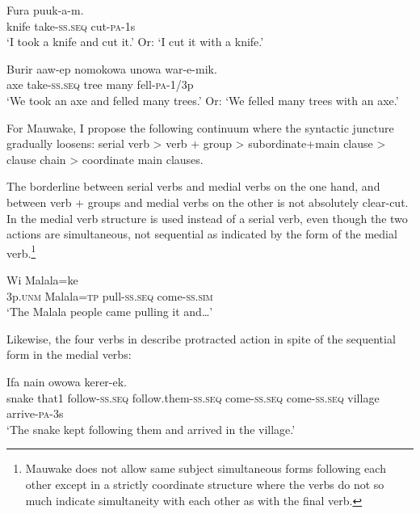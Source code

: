 \ea%
\label{ex:3:x387}
\gll Fura  puuk-a-m. \\
knife take-\textsc{ss}.\textsc{seq} cut-\textsc{pa}-1s \\
\glt`I took a knife and cut it.' Or: `I cut it with a knife.'
\z

\ea%
\label{ex:3:x388}
\gll Burir aaw-ep nomokowa unowa war-e-mik. \\
axe take-\textsc{ss}.\textsc{seq} tree many fell-\textsc{pa}-1/3p \\
\glt`We took an axe and felled many trees.' Or: `We felled many trees with an axe.'
\z

For Mauwake, I propose the following continuum where the syntactic juncture gradually loosens: serial verb {{\textgreater}} verb +  group {{\textgreater}} subordinate+main clause {{\textgreater}} clause chain {{\textgreater}} coordinate main clauses.

The borderline between serial verbs and medial verbs on the one hand, and between verb +  groups and medial verbs on the other is not absolutely clear-cut. In  the medial verb structure is used instead of a serial verb, even though the two actions are simultaneous, not sequential as indicated by the form of the medial verb.\footnote{Mauwake does not allow same subject simultaneous forms following each other except in a strictly coordinate structure where the verbs do not so much indicate simultaneity with each other as with the final verb.} 

\ea%
\label{ex:3:x389}
\gll Wi Malala=ke   \\
3p.\textsc{unm} Malala=\textsc{tp} pull-\textsc{ss}.\textsc{seq} come-\textsc{ss}.\textsc{sim} \\
\glt`The Malala people came pulling it and{\dots}'
\z

Likewise, the four verbs in  describe  protracted action in spite of the sequential form in the medial verbs:

\ea%
\label{ex:3:x390}
\gll Ifa nain     owowa kerer-ek.\\
snake that1 follow-\textsc{ss}.\textsc{seq} follow.them-\textsc{ss}.\textsc{seq} come-\textsc{ss}.\textsc{seq} come-\textsc{ss}.\textsc{seq} village arrive-\textsc{pa}-3s\\
\glt`The snake kept following them and arrived in the village.'
\z

